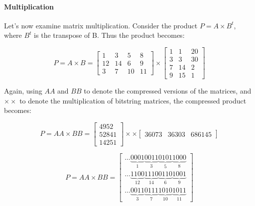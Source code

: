 \documentclass[10pt]{article}
\begin{document}
\paragraph{Multiplication}

Let's now examine matrix multiplication. Consider the product $P = A \times
B^{t}$, where $B^t$ is the transpose of B. Thus the product becomes:

\begin{equation}
	P = A \times B = \begin{bmatrix}
		1 & 3 & 5 & 8\\ 
		12 &14  & 6 & 9\\ 
		3 & 7 & 10 & 11
		\end{bmatrix}
        \times
		\begin{bmatrix}
		  1 & 1  & 20\\ 
		  3 & 3  & 30\\
		  7 & 14 & 2\\
		  9 & 15 & 1
		\end{bmatrix}
\end{equation}

Again, using $AA$ and $BB$ to denote the compressed versions of the matrices,
and $\times\times$ to denote the multiplication of bitstring matrices, the
compressed product becomes:

\begin{equation}\label{eq:prodbs}
	P = AA \times BB =\begin{bmatrix}
			    4952\\ 
			    52841\\ 
			    14251
			  \end{bmatrix} 
        \times\times
	\begin{bmatrix}
	  36073 & 36303 & 686145
	\end{bmatrix}
\end{equation}

\begin{equation}
	P = AA \times BB = 
    	\begin{bmatrix}
\ldots\underbrace{0001}_{1}\underbrace{0011}_{3}\underbrace{0101}_{5}\underbrace
{1000}_{8}\\
\ldots\underbrace{1100}_{12}\underbrace{1110}_{14}\underbrace{0110}_{6}
\underbrace{1001}_{9}\\
\ldots\underbrace{0011}_{3}\underbrace{0111}_{7}\underbrace{1010}_{10}
\underbrace{1011}_{11}
	\end{bmatrix}
\end{equation}
\end{document}
